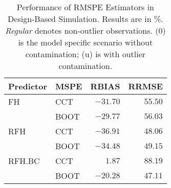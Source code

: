 \begin{table}[!tbp]
\begin{center}
\begin{tabular}{llrr}
\hline\hline
\multicolumn{1}{c}{Predictor}&\multicolumn{1}{c}{MSPE}&\multicolumn{1}{c}{RBIAS}&\multicolumn{1}{c}{RRMSE}\tabularnewline
\hline
FH&CCT&$-31.70$&$55.50$\tabularnewline
&BOOT&$-29.77$&$56.03$\tabularnewline
RFH&CCT&$-36.91$&$48.06$\tabularnewline
&BOOT&$-34.48$&$49.15$\tabularnewline
RFH.BC&CCT&$  1.87$&$88.19$\tabularnewline
&BOOT&$-20.28$&$47.11$\tabularnewline
\hline
\end{tabular}

\caption[Performance of RMSPE Estimators in Design\hyp{}Based Simulation]{\label{tab:mse_performace_design}Performance of RMSPE Estimators in Design\hyp{}Based Simulation. Results are in \%. \textit{Regular} denotes non\hyp{}outlier observations. (0) is the model specific scenario without contamination; (u) is with outlier contamination.\label{x}}\end{center}

\end{table}
